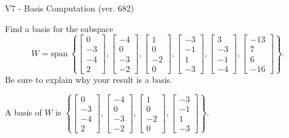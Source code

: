 \begin{exercise}
  \begin{exerciseTitle}V7 - Basis Computation (ver. 682)\end{exerciseTitle}
  \begin{exerciseStatement}
    Find a basis for the subspace 
\[W=\mathrm{span}\ \left\{\left[\begin{array}{r}
0 \\
-3 \\
-4 \\
2
\end{array}\right] , \left[\begin{array}{r}
-4 \\
0 \\
-3 \\
-2
\end{array}\right] , \left[\begin{array}{r}
1 \\
0 \\
-2 \\
0
\end{array}\right] , \left[\begin{array}{r}
-3 \\
-1 \\
1 \\
-3
\end{array}\right] , \left[\begin{array}{r}
3 \\
-3 \\
-1 \\
-4
\end{array}\right] , \left[\begin{array}{r}
-13 \\
7 \\
6 \\
-16
\end{array}\right]\right\}.\]
 Be sure to explain why your result is a basis.


  \end{exerciseStatement}
  \begin{exerciseAnswer}
   A basis of \(W\) is  \(\left\{\left[\begin{array}{r}
0 \\
-3 \\
-4 \\
2
\end{array}\right] , \left[\begin{array}{r}
-4 \\
0 \\
-3 \\
-2
\end{array}\right] , \left[\begin{array}{r}
1 \\
0 \\
-2 \\
0
\end{array}\right] , \left[\begin{array}{r}
-3 \\
-1 \\
1 \\
-3
\end{array}\right]\right\}\).
  


  \end{exerciseAnswer}
\end{exercise}
